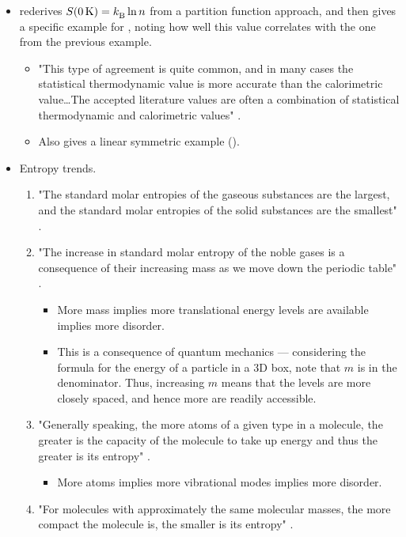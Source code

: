 \documentclass[../notes.tex]{subfiles}
\begin{document}
\begin{itemize}
\begin{itemize}
    \end{itemize}
    \item \textcite{bib:McQuarrieSimon} rederives $S(\SI{0}{\kelvin})={k_\text{B}^{}}\ln n$ from a partition function approach, and then gives a specific example for , noting how well this value correlates with the one from the previous example.
    \begin{itemize}
        \item "This type of agreement is quite common, and in many cases the statistical thermodynamic value is more accurate than the calorimetric value\dots The accepted literature values are often a combination of statistical thermodynamic and calorimetric values" \parencite[863]{bib:McQuarrieSimon}.
        \item Also gives a linear symmetric example ().
    \end{itemize}
    \item Entropy trends.
    \begin{enumerate}
        \item "The standard molar entropies of the gaseous substances are the largest, and the standard molar entropies of the solid substances are the smallest" \parencite[865]{bib:McQuarrieSimon}.
        \item "The increase in standard molar entropy of the noble gases is a consequence of their increasing mass as we move down the periodic table" \parencite[865]{bib:McQuarrieSimon}.
        \begin{itemize}
            \item More mass implies more translational energy levels are available implies more disorder.
            \item This is a consequence of quantum mechanics --- considering the formula for the energy of a particle in a 3D box, note that $m$ is in the denominator. Thus, increasing $m$ means that the levels are more closely spaced, and hence more are readily accessible.
        \end{itemize}
        \item "Generally speaking, the more atoms of a given type in a molecule, the greater is the capacity of the molecule to take up energy and thus the greater is its entropy" \parencite[866]{bib:McQuarrieSimon}.
        \begin{itemize}
            \item More atoms implies more vibrational modes implies more disorder.
        \end{itemize}
        \item "For molecules with approximately the same molecular masses, the more compact the molecule is, the smaller is its entropy" \parencite[867]{bib:McQuarrieSimon}.

\end{enumerate}
\end{itemize}
\end{document}
